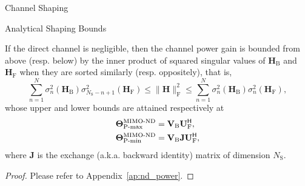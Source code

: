 \documentclass[journal]{IEEEtran}
\begin{document}
\begin{section}{Channel Shaping}
\begin{subsection}{Analytical Shaping Bounds}
		\begin{corollary}
			\label{co:nd_power}
			If the direct channel is negligible, then the channel power gain is bounded from above (resp. below) by the inner product of squared singular values of $\mathbf{H}_\mathrm{B}$ and $\mathbf{H}_\mathrm{F}$ when they are sorted similarly (resp. oppositely), that is,
			\begin{equation}
				\label{iq:power_nd}
				\sum_{n=1}^N \sigma_n^2(\mathbf{H}_\mathrm{B}) \sigma_{N_\mathrm{S}-n+1}^2(\mathbf{H}_\mathrm{F}) \le \lVert \mathbf{H} \rVert _\mathrm{F}^2 \le \sum_{n=1}^N \sigma_n^2(\mathbf{H}_\mathrm{B}) \sigma_n^2(\mathbf{H}_\mathrm{F}),
			\end{equation}
			whose upper and lower bounds are attained respectively at
			\begin{subequations}
				\label{eq:ris_nd_power}
				\begin{align}
					\mathbf{\Theta}_\textnormal{P-max}^\textnormal{MIMO-ND} & = \mathbf{V}_\mathrm{B} \mathbf{U}_\mathrm{F}^\mathsf{H}, \label{eq:ris_nd_power_max}            \\
					\mathbf{\Theta}_\textnormal{P-min}^\textnormal{MIMO-ND} & = \mathbf{V}_\mathrm{B} \mathbf{J} \mathbf{U}_\mathrm{F}^\mathsf{H} \label{eq:ris_nd_power_min},
				\end{align}
			\end{subequations}
			where $\mathbf{J}$ is the exchange (a.k.a. backward identity) matrix of dimension $N_\mathrm{S}$.
		\end{corollary}
		\begin{proof}
			Please refer to Appendix~\ref{ap:nd_power}.
		\end{proof}


\end{subsection}
\end{section}
\end{document}
